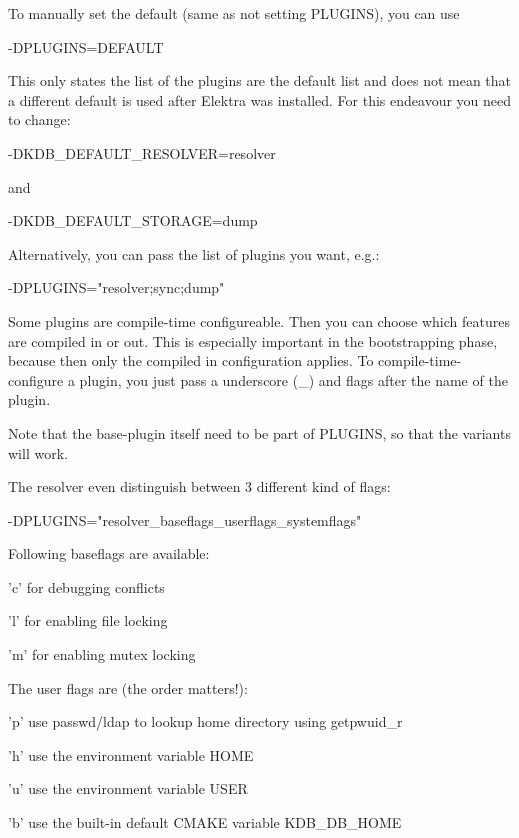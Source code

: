 To manually set the default (same as not setting P\+L\+U\+G\+I\+N\+S), you can use \begin{DoxyVerb}    -DPLUGINS=DEFAULT
\end{DoxyVerb}


This only states the list of the plugins are the default list and does not mean that a different default is used after Elektra was installed. For this endeavour you need to change\+: \begin{DoxyVerb}    -DKDB_DEFAULT_RESOLVER=resolver
\end{DoxyVerb}


and \begin{DoxyVerb}    -DKDB_DEFAULT_STORAGE=dump
\end{DoxyVerb}


Alternatively, you can pass the list of plugins you want, e.\+g.\+: \begin{DoxyVerb}    -DPLUGINS="resolver;sync;dump"
\end{DoxyVerb}


Some plugins are compile-\/time configureable. Then you can choose which features are compiled in or out. This is especially important in the bootstrapping phase, because then only the compiled in configuration applies. To compile-\/time-\/configure a plugin, you just pass a underscore (\+\_\+) and flags after the name of the plugin.

Note that the base-\/plugin itself need to be part of P\+L\+U\+G\+I\+N\+S, so that the variants will work.

The resolver even distinguish between 3 different kind of flags\+: \begin{DoxyVerb}    -DPLUGINS="resolver_baseflags_userflags_systemflags"
\end{DoxyVerb}


Following baseflags are available\+:


\begin{DoxyItemize}
\item 'c' for debugging conflicts
\item 'l' for enabling file locking
\item 'm' for enabling mutex locking
\end{DoxyItemize}

The user flags are (the order matters!)\+:


\begin{DoxyItemize}
\item 'p' use passwd/ldap to lookup home directory using getpwuid\+\_\+r
\item 'h' use the environment variable H\+O\+M\+E
\item 'u' use the environment variable U\+S\+E\+R
\item 'b' use the built-\/in default C\+M\+A\+K\+E variable K\+D\+B\+\_\+\+D\+B\+\_\+\+H\+O\+M\+E
\end{DoxyItemize}

